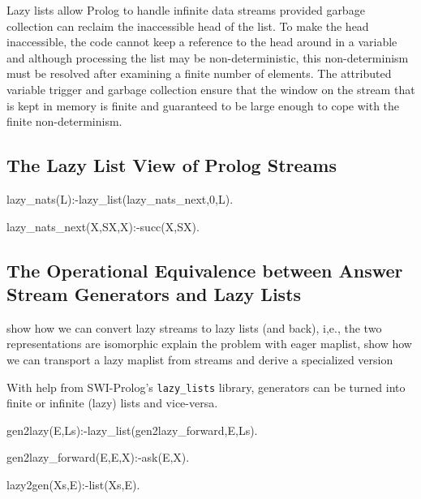 \documentclass{new_tlp}
\begin{document}
Lazy lists allow Prolog to handle infinite data streams provided garbage
collection can reclaim the inaccessible head of the list. To make the
head inaccessible, the code cannot keep a reference to the head around
in a variable and although processing the list may be non-deterministic,
this non-determinism must be resolved after examining a finite number of
elements.  The attributed variable trigger and garbage collection ensure
that the window on the stream that is kept in memory is finite and
guaranteed to be large enough to cope with the finite non-determinism.






\subsection{The Lazy List View of Prolog Streams}

 
 \begin{code}
%
lazy_nats(L):-lazy_list(lazy_nats_next,0,L).

lazy_nats_next(X,SX,X):-succ(X,SX).
\end{code}
   
\subsection{The Operational Equivalence between Answer Stream Generators and Lazy Lists}

\BI

   \I show how we can convert lazy streams to lazy lists (and back), i,e., the two representations are isomorphic
   \I explain the problem with eager maplist, show how we can transport a lazy maplist from streams and derive a specialized version


\EI

With help from SWI-Prolog's {\tt lazy\_lists} library, generators can be turned into finite or infinite (lazy) lists and vice-versa.
\begin{code}
%
gen2lazy(E,Ls):-lazy_list(gen2lazy_forward,E,Ls).

gen2lazy_forward(E,E,X):-ask(E,X).

%
lazy2gen(Xs,E):-list(Xs,E).

\end{code}
\end{document}
